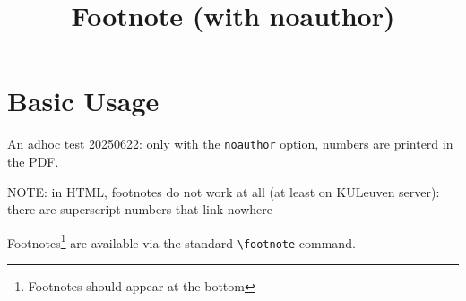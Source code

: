 \documentclass[noauthor]{ximera}
\title{Footnote (with noauthor)}
\begin{document}
\begin{abstract}
\end{abstract}
\maketitle


\section{Basic Usage}

An adhoc test 20250622: only with the \verb|noauthor| option, numbers are printerd in the PDF.

NOTE: in HTML, footnotes do not work at all (at least on KULeuven server): there are superscript-numbers-that-link-nowhere

Footnotes\footnote{Footnotes should appear at the bottom} are available via the standard \verb|\footnote| command.


\hrulefill
\end{document}
